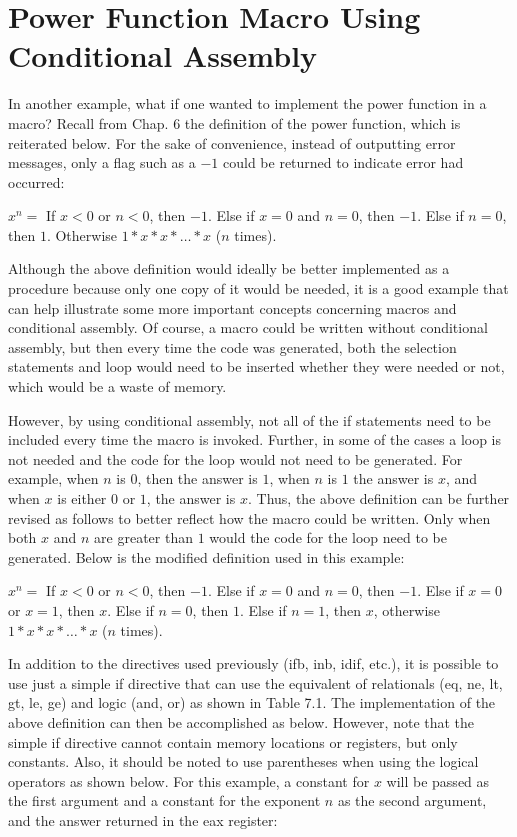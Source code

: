 \documentclass[10pt]{book}
\begin{document}
\section{Power Function Macro Using Conditional Assembly}
In another example, what if one wanted to implement the power function in a macro? Recall from Chap. 6 the definition of the power function, which is reiterated below. For the sake of convenience, instead of outputting error messages, only a flag such as a $-1$ could be returned to indicate error had occurred:

$x^{n} =$ If $x<0$ or $n<0$, then $-1$. Else if $x=0$ and $n=0$, then $-1$. Else if $n=0$, then $1$. Otherwise $1*x*x*\ldots*x$ ($n$ times).

Although the above definition would ideally be better implemented as a procedure because only one copy of it would be needed, it is a good example that can help illustrate some more important concepts concerning macros and conditional assembly. Of course, a macro could be written without conditional assembly, but then every time the code was generated, both the selection statements and loop would need to be inserted whether they were needed or not, which would be a waste of memory.

However, by using conditional assembly, not all of the if statements need to be included every time the macro is invoked. Further, in some of the cases a loop is not needed and the code for the loop would not need to be generated. For example, when $n$ is $0$, then the answer is $1$, when $n$ is $1$ the answer is $x$, and when $x$ is either $0$ or $1$, the answer is $x$. Thus, the above definition can be further revised as follows to better reflect how the macro could be written. Only when both $x$ and $n$ are greater than $1$ would the code for the loop need to be generated. Below is the modified definition used in this example:

$x^{n} =$ If $x<0$ or $n<0$, then $-1$. Else if $x=0$ and $n=0$, then $-1$. Else if $x=0$ or $x=1$, then $x$. Else if $n=0$, then $1$. Else if $n=1$, then $x$, otherwise $1 * x * x * \ldots * x$ ($n$ times).

In addition to the directives used previously (ifb, inb, idif, etc.), it is possible to use just a simple if directive that can use the equivalent of relationals (eq, ne, lt, gt, le, ge) and logic (and, or) as shown in Table 7.1. The implementation of the above definition can then be accomplished as below. However, note that the simple if directive cannot contain memory locations or registers, but only constants. Also, it should be noted to use parentheses when using the logical operators as shown below. For this example, a constant for $x$ will be passed as the first argument and a constant for the exponent $n$ as the second argument, and the answer returned in the eax register:
\end{document}
